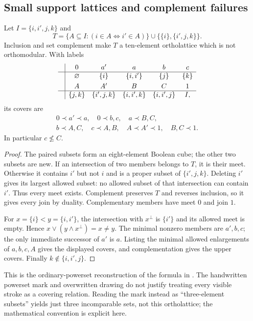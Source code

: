 \subsection{Small support lattices and complement failures}

\begin{proposition}\label{prop:ten-lattice}
Let $I=\{i,i',j,k\}$ and
\[
 T=\{A\subseteq I:(i\in A\Longleftrightarrow i'\in A)\}
       \cup\{\{i\},\{i',j,k\}\}.
\]
Inclusion and set complement make $T$ a ten-element ortholattice
which is not orthomodular. With labels
\[
\begin{array}{c|ccccc}
&0&a'&a&b&c\\\hline
&\varnothing&\{i\}&\{i,i'\}&\{j\}&\{k\}\\[3pt]
&A&A'&B&C&1\\\hline
&\{j,k\}&\{i',j,k\}&\{i,i',k\}&\{i,i',j\}&I,
\end{array}
\]
its covers are
\[
\begin{gathered}
0\prec a'\prec a,\quad 0\prec b,c,\quad a\prec B,C,\\
b\prec A,C,\quad c\prec A,B,\quad A\prec A'\prec1,
\quad B,C\prec1.
\end{gathered}
\]
In particular $c\not\leq C$.
\end{proposition}
\begin{proof}
The paired subsets form an eight-element Boolean cube; the other
two subsets are new. If an intersection of two members belongs
to $T$, it is their meet. Otherwise it contains $i'$ but not $i$
and is a proper subset of $\{i',j,k\}$. Deleting $i'$ gives its
largest allowed subset: no allowed subset of that intersection
can contain $i'$. Thus every meet exists. Complement preserves
$T$ and reverses inclusion, so it gives every join by duality.
Complementary members have meet $0$ and join $1$.

For $x=\{i\}<y=\{i,i'\}$, the intersection with $x^\perp$
is $\{i'\}$ and its allowed meet is empty. Hence
$x\vee(y\wedge x^\perp)=x\ne y$.
The minimal nonzero members are $a',b,c$; the only immediate
successor of $a'$ is $a$. Listing the minimal allowed enlargements
of $a,b,c,A$ gives the displayed covers, and complementation
gives the upper covers. Finally $k\notin\{i,i',j\}$.
\end{proof}

This is the ordinary-powerset reconstruction of the formula in
\cite[part~9, archive sheet~112, PDF p.~113]{Groth}. The handwritten
powerset mark and overwritten drawing do not justify treating every
visible stroke as a covering relation. Reading the mark instead as
``three-element subsets'' yields just three incomparable sets,
not this ortholattice; the mathematical convention is explicit here.

